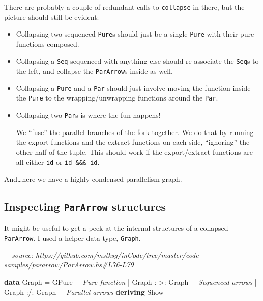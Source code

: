 \documentclass[]{article}
\newenvironment{Shaded}{}{}
\newcommand{\CommentTok}[1]{\textcolor[rgb]{0.38,0.63,0.69}{\textit{#1}}}
\newcommand{\DataTypeTok}[1]{\textcolor[rgb]{0.56,0.13,0.00}{#1}}
\newcommand{\KeywordTok}[1]{\textcolor[rgb]{0.00,0.44,0.13}{\textbf{#1}}}
\newcommand{\OperatorTok}[1]{\textcolor[rgb]{0.40,0.40,0.40}{#1}}
\newcommand{\OtherTok}[1]{\textcolor[rgb]{0.00,0.44,0.13}{#1}}
\begin{document}
There are probably a couple of redundant calls to \texttt{collapse} in there,
but the picture should still be evident:

\begin{itemize}
\item
  Collapsing two sequenced \texttt{Pure}s should just be a single \texttt{Pure}
  with their pure functions composed.
\item
  Collapsing a \texttt{Seq} sequenced with anything else should re-associate the
  \texttt{Seq}s to the left, and collapse the \texttt{ParArrow}s inside as well.
\item
  Collapsing a \texttt{Pure} and a \texttt{Par} should just involve moving the
  function inside the \texttt{Pure} to the wrapping/unwrapping functions around
  the \texttt{Par}.
\item
  Collapsing two \texttt{Par}s is where the fun happens!

  We ``fuse'' the parallel branches of the fork together. We do that by running
  the export functions and the extract functions on each side, ``ignoring'' the
  other half of the tuple. This should work if the export/extract functions are
  all either \texttt{id} or \texttt{id\ \&\&\&\ id}.
\end{itemize}

And\ldots here we have a highly condensed parallelism graph.

\hypertarget{inspecting-pararrow-structures}{%
\subsection{\texorpdfstring{Inspecting \texttt{ParArrow}
structures}{Inspecting ParArrow structures}}\label{inspecting-pararrow-structures}}

It might be useful to get a peek at the internal structures of a collapsed
\texttt{ParArrow}. I used a helper data type, \texttt{Graph}.

\begin{Shaded}
\begin{Highlighting}[]
\CommentTok{{-}{-} source: https://github.com/mstksg/inCode/tree/master/code{-}samples/pararrow/ParArrow.hs\#L76{-}L79}

\KeywordTok{data} \DataTypeTok{Graph} \OtherTok{=} \DataTypeTok{GPure}                  \CommentTok{{-}{-} Pure function}
           \OperatorTok{|} \DataTypeTok{Graph} \OperatorTok{:{-}>:} \DataTypeTok{Graph}       \CommentTok{{-}{-} Sequenced arrows}
           \OperatorTok{|} \DataTypeTok{Graph} \OperatorTok{:/:} \DataTypeTok{Graph}        \CommentTok{{-}{-} Parallel arrows}
           \KeywordTok{deriving} \DataTypeTok{Show}
\end{Highlighting}
\end{Shaded}
\end{document}
